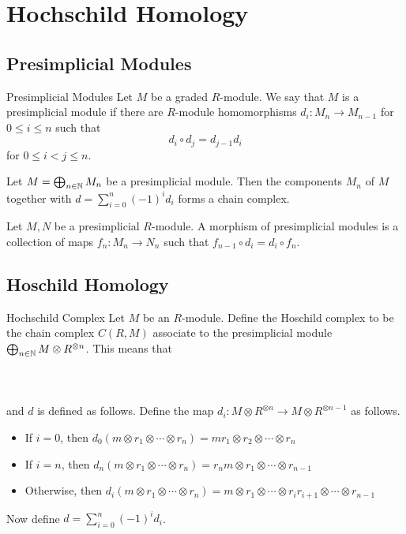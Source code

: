 \documentclass[a4paper]{article}
\begin{document}
\pagebreak
\section{Hochschild Homology}
\subsection{Presimplicial Modules}
\begin{defn}{Presimplicial Modules}{} Let $M$ be a graded $R$-module. We say that $M$ is a presimplicial module if there are $R$-module homomorphisms $d_i:M_n\to M_{n-1}$ for $0\leq i\leq n$ such that $$d_i\circ d_j=d_{j-1}d_i$$ for $0\leq i<j\leq n$. 
\end{defn}

\begin{prp}{}{} Let $M=\bigoplus_{n\in\mathbb{N}}M_n$ be a presimplicial module. Then the components $M_n$ of $M$ together with $d=\sum_{i=0}^n(-1)^id_i$ forms a chain complex. 
\end{prp}

\begin{prp}{}{} Let $M,N$ be a presimplicial $R$-module. A morphism of presimplicial modules is a collection of maps $f_n:M_n\to N_n$ such that $f_{n-1}\circ d_i=d_i\circ f_n$. 
\end{prp}

\subsection{Hoschild Homology}
\begin{defn}{Hochschild Complex}{} Let $M$ be an $R$-module. Define the Hoschild complex to be the chain complex $C(R,M)$ associate to the presimplicial module $\bigoplus_{n\in\mathbb{N}} M\otimes R^{\otimes n}$. This means that \\~\\
\\~\\
and $d$ is defined as follows. Define the map $d_i:M\otimes R^{\otimes n}\to M\otimes R^{\otimes n-1}$ as follows. 
\begin{itemize}
\item If $i=0$, then $d_0(m\otimes r_1\otimes\cdots\otimes r_n)=mr_1\otimes r_2\otimes\cdots\otimes r_n$
\item If $i=n$, then $d_n(m\otimes r_1\otimes\cdots\otimes r_n)=r_nm\otimes r_1\otimes\cdots\otimes r_{n-1}$
\item Otherwise, then $d_i(m\otimes r_1\otimes\cdots\otimes r_n)=m\otimes r_1\otimes\cdots\otimes r_ir_{i+1}\otimes \cdots\otimes r_{n-1}$
\end{itemize}
Now define $d=\sum_{i=0}^n(-1)^id_i$. 
\end{defn}
\end{document}

